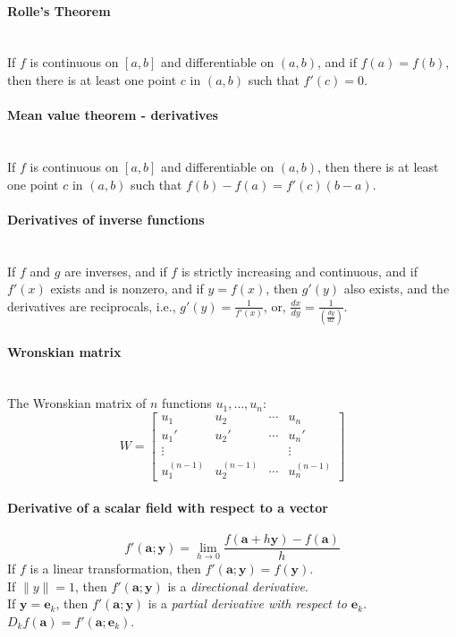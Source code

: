 \documentclass[10pt]{article}
\newcommand{\bs}[1]{\pmb{#1}}
\begin{document}
\paragraph{Rolle's Theorem}\ \\
If $f$ is continuous on $[a,b]$ and differentiable on $(a,b)$, and if $f(a)=f(b)$,
then there is at least one point $c$ in $(a,b)$ such that $f'(c)=0$.

\paragraph{Mean value theorem - derivatives}\ \\
If $f$ is continuous on $[a,b]$ and differentiable on $(a,b)$,
then there is at least one point $c$ in $(a,b)$ such that $f(b)-f(a)=f'(c)(b-a)$.

\paragraph{Derivatives of inverse functions}\ \\
If $f$ and $g$ are inverses, and if $f$ is strictly increasing and continuous,
and if $f'(x)$ exists and is nonzero, and if $y = f(x)$, then $g'(y)$ also
exists, and the derivatives are reciprocals, i.e., $g'(y) = \frac{1}{f'(x)}$,
or, $\frac{dx}{dy} = \frac{1}{\left( \frac{dy}{dx} \right)}$.

\paragraph{Wronskian matrix}\ \\
The Wronskian matrix of $n$ functions $u_1, \dotsc, u_n$:
\begin{equation*}
W =
\begin{bmatrix}
u_1 & u_2 & \cdots & u_n \\
u_1' & u_2' & \cdots & u_n'\\
\vdots & & & \vdots\\
u_1^{(n-1)} & u_2^{(n-1)} & \cdots & u_n^{(n-1)}
\end{bmatrix}
\end{equation*}

\paragraph{Derivative of a scalar field with respect to a vector}
\begin{equation*}
f'(\bs{a}; \bs{y}) = \lim_{h\to 0} \frac{f(\bs{a}+h\bs{y}) - f(\bs{a})}{h}
\end{equation*}
If $f$ is a linear transformation, then $f'(\bs{a};\bs{y}) = f(\bs{y})$.\\
If $\lVert y \rVert = 1$, then $f'(\bs{a};\bs{y})$ is a {\it directional derivative}.\\
If $\bs{y} = \bs{e}_k$, then $f'(\bs{a};\bs{y})$ is a {\it partial derivative with respect to $\bs{e}_k$}.\\
$D_kf(\bs{a}) = f'(\bs{a};\bs{e}_k)$.
\end{document}
